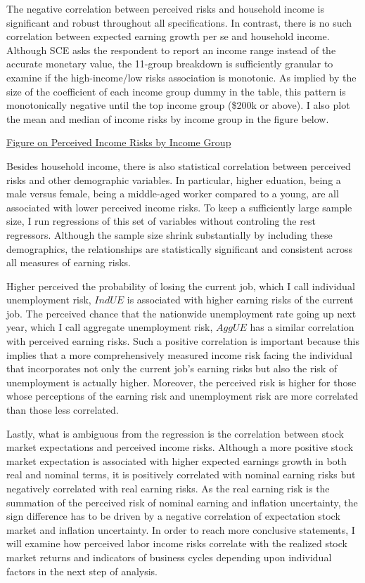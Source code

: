 \documentclass[12pt,notitlepage,onecolumn,aps,pra]{revtex4-1}
\begin{document}
The negative correlation between perceived risks and household income is
significant and robust throughout all specifications. In contrast, there
is no such correlation between expected earning growth per se and
household income. Although SCE asks the respondent to report an income
range instead of the accurate monetary value, the 11-group breakdown is
sufficiently granular to examine if the high-income/low risks
association is monotonic. As implied by the size of the coefficient of
each income group dummy in the table, this pattern is monotonically
negative until the top income group (\$200k or above). I also plot the
mean and median of income risks by income group in the figure below.

\href{'../Graphs/ind/riskbyincome.jpg'}{Figure on Perceived Income Risks
by Income Group}

Besides household income, there is also statistical correlation between
perceived risks and other demographic variables. In particular, higher
eduation, being a male versus female, being a middle-aged worker
compared to a young, are all associated with lower perceived income
risks. To keep a sufficiently large sample size, I run regressions of
this set of variables without controling the rest regressors. Although
the sample size shrink substantially by including these demographics,
the relationships are statistically significant and consistent across
all measures of earning risks.

Higher perceived the probability of losing the current job, which I call
individual unemployment risk, \(\textit{IndUE}\) is associated with
higher earning risks of the current job. The perceived chance that the
nationwide unemployment rate going up next year, which I call aggregate
unemployment risk, \(\textit{AggUE}\) has a similar correlation with
perceived earning risks. Such a positive correlation is important
because this implies that a more comprehensively measured income risk
facing the individual that incorporates not only the current job's
earning risks but also the risk of unemployment is actually higher.
Moreover, the perceived risk is higher for those whose perceptions of
the earning risk and unemployment risk are more correlated than those
less correlated.

Lastly, what is ambiguous from the regression is the correlation between
stock market expectations and perceived income risks. Although a more
positive stock market expectation is associated with higher expected
earnings growth in both real and nominal terms, it is positively
correlated with nominal earning risks but negatively correlated with
real earning risks. As the real earning risk is the summation of the
perceived risk of nominal earning and inflation uncertainty, the sign
difference has to be driven by a negative correlation of expectation
stock market and inflation uncertainty. In order to reach more
conclusive statements, I will examine how perceived labor income risks
correlate with the realized stock market returns and indicators of
business cycles depending upon individual factors in the next step of
analysis.
\end{document}
